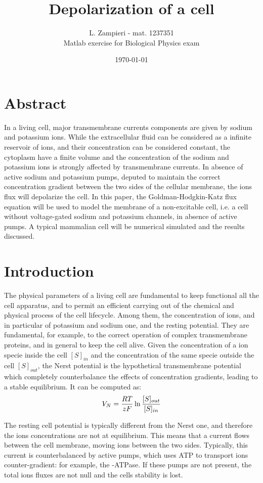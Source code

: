 \documentclass[11pt,a4 paper]{article}
\title{Depolarization of a cell}
\author{L. Zampieri - mat. 1237351\\Matlab exercise for Biological Physics exam}
\date{\today}
\let\oldfrac\frac
\renewcommand{\frac}[3][d]{\ifthenelse{\equal{#1}{d}}{\oldfrac{#2}{#3}}{\nicefrac{#2}{#3}}}
\begin{document}
    
\maketitle

\section*{Abstract}
In a living cell, major transmembrane currents components are given by sodium and potassium ions. While the extracellular fluid can be considered as a infinite reservoir of ions, and their concentration can be considered constant, the cytoplasm have a finite volume and the concentration of the sodium and potassium ions is strongly affected by transmembrane currents. In absence of active sodium and potassium pumps, deputed to maintain the correct concentration gradient between the two sides of the cellular membrane, the ions flux will depolarize the cell. In this paper, the Goldman-Hodgkin-Katz flux equation will be used to model the membrane of a non-excitable cell, i.e. a cell without voltage-gated sodium and potassium channels, in absence of active pumps. A typical mammalian cell will be numerical simulated and the results discussed.

\section{Introduction}
The physical parameters of a living cell are fundamental to keep functional all the cell apparatus, and to permit an efficient carrying out of the chemical and physical process of the cell lifecycle. Among them, the concentration of ions, and in particular of potassium and sodium one, and the resting potential. They are fundamental, for example, to the correct operation of complex transmembrane proteins, and in general to keep the cell alive. Given the concentration of a ion specie inside the cell $[S]_{in}$ and the concentration of the same specie outside the cell $[S]_{out}$, the Nerst potential is the hypothetical transmembrane potential which completely counterbalance the effects of concentration gradients, leading to a stable equilibrium. It can be computed as:
\begin{align*}
    V_N = \frac{RT}{zF} \ln\frac{[S]_{out}}{[S]_{in}}
\end{align*}

The resting cell potential is typically different from the Nerst one, and therefore the ions concentrations are not at equilibrium. This means that a current flows between the cell membrane, moving ions between the two sides. Typically, this current is counterbalanced by active pumps, which uses ATP to transport ions counter-gradient: for example, the -ATPase. If these pumps are not present, the total ions fluxes are not null and the cells stability is lost.
\end{document}
